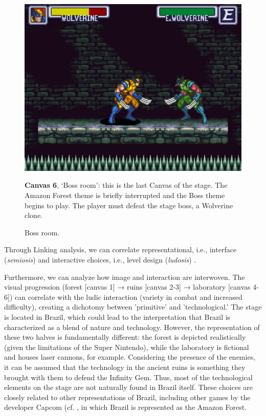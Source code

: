\documentclass[english]{textolivre}
\begin{document}
\begin{figure}[htbp]
\begin{minipage}[t]{.47\textwidth}
\vspace{0pt}
\includegraphics[width=\textwidth]{fig-012.png}
\caption{Boss room.}
\label{fig-012}
\end{minipage}
\hfill
\begin{minipage}[t]{.47\textwidth}
\vspace{2pt}
\textbf{Canvas 6}, ‘Boss room’: this is the last Canvas of the stage. The Amazon Forest theme is briefly interrupted and the Boss theme begins to play. The player must defeat the stage boss, a Wolverine clone.
\end{minipage}
\end{figure}


Through Linking analysis, we can correlate representational, i.e., interface (\textit{semiosis}) and interactive choices, i.e., level design (\textit{ludosis}) \textcite[p. 27]{egenfeldt-nielsen_understanding_2016}.

Furthermore, we can analyze how image and interaction are interwoven. The visual progression (forest [canvas 1] → ruins [canvas 2-3] → laboratory [canvas 4-6]) can correlate with the ludic interaction (variety in combat and increased difficulty), creating a dichotomy between 'primitive' and 'technological.' The stage is located in Brazil, which could lead to the interpretation that Brazil is characterized as a blend of nature and technology. However, the representation of these two halves is fundamentally different: the forest is depicted realistically (given the limitations of the Super Nintendo), while the laboratory is fictional and houses laser cannons, for example. Considering the presence of the enemies, it can be assumed that the technology in the ancient ruins is something they brought with them to defend the Infinity Gem. Thus, most of the technological elements on the stage are not naturally found in Brazil itself. These choices are closely related to other representations of Brazil, including other games by the developer Capcom (cf. \textcite{capcom_street_1991}, in which Brazil is represented as the Amazon Forest.
\end{document}
